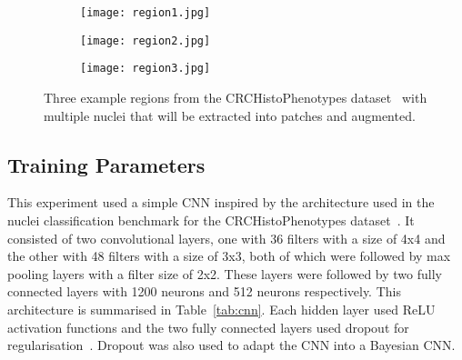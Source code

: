 \begin{figure}[t!]
	\centering
	\begin{subfigure}{0.3\textwidth}
		\texttt{[image: region1.jpg]}
	\end{subfigure}
	\begin{subfigure}{0.3\textwidth}
		\texttt{[image: region2.jpg]}
	\end{subfigure}
	\begin{subfigure}{0.3\textwidth}
		\texttt{[image: region3.jpg]}
	\end{subfigure}
	\caption{Three example regions from the CRCHistoPhenotypes dataset~\cite{sirinukunwattana2016locality} with multiple nuclei that will be extracted into patches and augmented.}
	\label{fig:region_example}
\end{figure}

\subsection{Training Parameters}
This experiment used a simple CNN inspired by the architecture used in the nuclei classification benchmark for the CRCHistoPhenotypes dataset~\cite{sirinukunwattana2016locality}. It consisted of two convolutional layers, one with 36 filters with a size of 4x4 and the other with 48 filters with a size of 3x3, both of which were followed by max pooling layers with a filter size of 2x2. These layers were followed by two fully connected layers with 1200 neurons and 512 neurons respectively. This architecture is summarised in Table~\ref{tab:cnn}. Each hidden layer used ReLU activation functions and the two fully connected layers used dropout for regularisation~\cite{srivastava2014dropout}. Dropout was also used to adapt the CNN into a Bayesian CNN.


